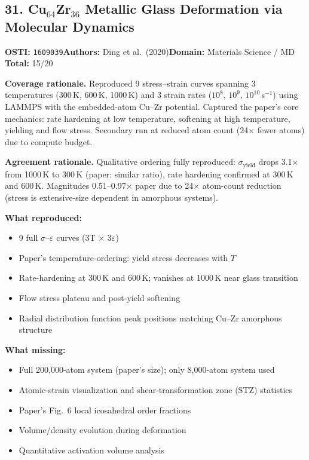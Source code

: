 \subsection{31. Cu$_{64}$Zr$_{36}$ Metallic Glass Deformation via Molecular Dynamics}
\textbf{OSTI:} \texttt{1609039}\quad\textbf{Authors:} Ding et al.\ (2020)\quad\textbf{Domain:} Materials Science / MD\\
\quad{}\quad\textbf{Total:} 15/20\par\smallskip
\noindent\textbf{Coverage rationale.} Reproduced 9 stress--strain curves spanning 3 temperatures (300\,K, 600\,K, 1000\,K) and 3 strain rates ($10^8$, $10^9$, $10^{10}$\,s$^{-1}$) using LAMMPS with the embedded-atom Cu--Zr potential. Captured the paper's core mechanics: rate hardening at low temperature, softening at high temperature, yielding and flow stress. Secondary run at reduced atom count (24$\times$ fewer atoms) due to compute budget.\par
\noindent\textbf{Agreement rationale.} Qualitative ordering fully reproduced: $\sigma_\mathrm{yield}$ drops 3.1$\times$ from 1000\,K to 300\,K (paper: similar ratio), rate hardening confirmed at 300\,K and 600\,K. Magnitudes 0.51--0.97$\times$ paper due to 24$\times$ atom-count reduction (stress is extensive-size dependent in amorphous systems).\par\smallskip
\noindent\textbf{What reproduced:}
\begin{itemize}[leftmargin=1.4em,itemsep=0.2em,topsep=0.2em]
\item 9 full $\sigma$--$\varepsilon$ curves (3T $\times$ 3$\dot{\varepsilon}$)
\item Paper's temperature-ordering: yield stress decreases with $T$
\item Rate-hardening at 300\,K and 600\,K; vanishes at 1000\,K near glass transition
\item Flow stress plateau and post-yield softening
\item Radial distribution function peak positions matching Cu--Zr amorphous structure
\end{itemize}
\noindent\textbf{What missing:}
\begin{itemize}[leftmargin=1.4em,itemsep=0.2em,topsep=0.2em]
\item Full 200,000-atom system (paper's size); only 8,000-atom system used
\item Atomic-strain visualization and shear-transformation zone (STZ) statistics
\item Paper's Fig.~6 local icosahedral order fractions
\item Volume/density evolution during deformation
\item Quantitative activation volume analysis
\end{itemize}
